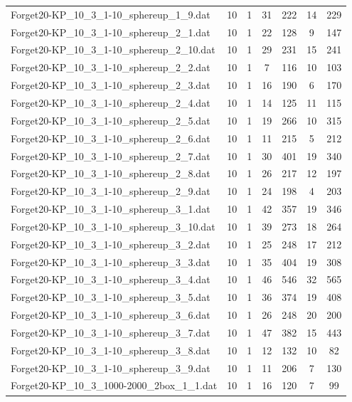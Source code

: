 \begin{table}[!ht]
\begin{tabular}{lcccccc}
Forget20-KP\_10\_3\_1-10\_sphereup\_1\_9.dat & 10 & 1 & 31 & 222 & 14 & 229 \\
Forget20-KP\_10\_3\_1-10\_sphereup\_2\_1.dat & 10 & 1 & 22 & 128 & 9 & 147 \\
Forget20-KP\_10\_3\_1-10\_sphereup\_2\_10.dat & 10 & 1 & 29 & 231 & 15 & 241 \\
Forget20-KP\_10\_3\_1-10\_sphereup\_2\_2.dat & 10 & 1 & 7 & 116 & 10 & 103 \\
Forget20-KP\_10\_3\_1-10\_sphereup\_2\_3.dat & 10 & 1 & 16 & 190 & 6 & 170 \\
Forget20-KP\_10\_3\_1-10\_sphereup\_2\_4.dat & 10 & 1 & 14 & 125 & 11 & 115 \\
Forget20-KP\_10\_3\_1-10\_sphereup\_2\_5.dat & 10 & 1 & 19 & 266 & 10 & 315 \\
Forget20-KP\_10\_3\_1-10\_sphereup\_2\_6.dat & 10 & 1 & 11 & 215 & 5 & 212 \\
Forget20-KP\_10\_3\_1-10\_sphereup\_2\_7.dat & 10 & 1 & 30 & 401 & 19 & 340 \\
Forget20-KP\_10\_3\_1-10\_sphereup\_2\_8.dat & 10 & 1 & 26 & 217 & 12 & 197 \\
Forget20-KP\_10\_3\_1-10\_sphereup\_2\_9.dat & 10 & 1 & 24 & 198 & 4 & 203 \\
Forget20-KP\_10\_3\_1-10\_sphereup\_3\_1.dat & 10 & 1 & 42 & 357 & 19 & 346 \\
Forget20-KP\_10\_3\_1-10\_sphereup\_3\_10.dat & 10 & 1 & 39 & 273 & 18 & 264 \\
Forget20-KP\_10\_3\_1-10\_sphereup\_3\_2.dat & 10 & 1 & 25 & 248 & 17 & 212 \\
Forget20-KP\_10\_3\_1-10\_sphereup\_3\_3.dat & 10 & 1 & 35 & 404 & 19 & 308 \\
Forget20-KP\_10\_3\_1-10\_sphereup\_3\_4.dat & 10 & 1 & 46 & 546 & 32 & 565 \\
Forget20-KP\_10\_3\_1-10\_sphereup\_3\_5.dat & 10 & 1 & 36 & 374 & 19 & 408 \\
Forget20-KP\_10\_3\_1-10\_sphereup\_3\_6.dat & 10 & 1 & 26 & 248 & 20 & 200 \\
Forget20-KP\_10\_3\_1-10\_sphereup\_3\_7.dat & 10 & 1 & 47 & 382 & 15 & 443 \\
Forget20-KP\_10\_3\_1-10\_sphereup\_3\_8.dat & 10 & 1 & 12 & 132 & 10 & 82 \\
Forget20-KP\_10\_3\_1-10\_sphereup\_3\_9.dat & 10 & 1 & 11 & 206 & 7 & 130 \\
Forget20-KP\_10\_3\_1000-2000\_2box\_1\_1.dat & 10 & 1 & 16 & 120 & 7 & 99 \\

\end{tabular}
\end{table}
